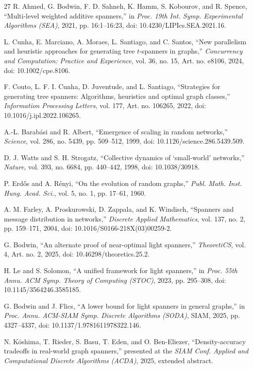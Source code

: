 \documentclass[conference]{IEEEtran}
\begin{document}
\begin{thebibliography}{27}
R. Ahmed, G. Bodwin, F. D. Sahneh, K. Hamm, S. Kobourov, and R. Spence,
``Multi-level weighted additive spanners,''
in \textit{Proc. 19th Int. Symp. Experimental Algorithms (SEA)},
2021, pp. 16:1--16:23,
doi: 10.4230/LIPIcs.SEA.2021.16.

L. Cunha, E. Marciano, A. Moraes, L. Santiago, and C. Santos,
``New parallelism and heuristic approaches for generating tree $t$-spanners in graphs,''
\textit{Concurrency and Computation: Practice and Experience},
vol. 36, no. 15, Art. no. e8106, 2024,
doi: 10.1002/cpe.8106.

F. Couto, L. F. I. Cunha, D. Juventude, and L. Santiago,
``Strategies for generating tree spanners: Algorithms, heuristics and optimal graph classes,''
\textit{Information Processing Letters},
vol. 177, Art. no. 106265, 2022,
doi: 10.1016/j.ipl.2022.106265.

A.-L. Barab\'{a}si and R. Albert,
``Emergence of scaling in random networks,''
\textit{Science},
vol. 286, no. 5439, pp. 509--512, 1999,
doi: 10.1126/science.286.5439.509.

D. J. Watts and S. H. Strogatz,
``Collective dynamics of `small-world' networks,''
\textit{Nature},
vol. 393, no. 6684, pp. 440--442, 1998,
doi: 10.1038/30918.

P. Erd\H{o}s and A. R\'{e}nyi,
``On the evolution of random graphs,''
\textit{Publ. Math. Inst. Hung. Acad. Sci.},
vol. 5, no. 1, pp. 17--61, 1960.

A. M. Farley, A. Proskurowski, D. Zappala, and K. Windisch,
``Spanners and message distribution in networks,''
\textit{Discrete Applied Mathematics},
vol. 137, no. 2, pp. 159--171, 2004,
doi: 10.1016/S0166-218X(03)00259-2.

G. Bodwin,
``An alternate proof of near-optimal light spanners,''
\textit{TheoretiCS},
vol. 4, Art. no. 2, 2025,
doi: 10.46298/theoretics.25.2.

H. Le and S. Solomon,
``A unified framework for light spanners,''
in \textit{Proc. 55th Annu. ACM Symp. Theory of Computing (STOC)},
2023, pp. 295--308,
doi: 10.1145/3564246.3585185.

G. Bodwin and J. Flics,
``A lower bound for light spanners in general graphs,''
in \textit{Proc. Annu. ACM-SIAM Symp. Discrete Algorithms (SODA)},
SIAM, 2025, pp. 4327--4337,
doi: 10.1137/1.9781611978322.146.

N. K\={o}shima, T. Rieder, S. Basu, T. Eden, and O. Ben-Eliezer,
``Density-accuracy tradeoffs in real-world graph spanners,''
presented at the \textit{SIAM Conf. Applied and Computational Discrete Algorithms (ACDA)},
2025, extended abstract.


\end{thebibliography}
\end{document}
